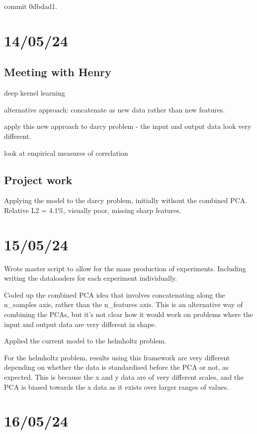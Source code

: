 \documentclass[11pt,a4paper]{article}
\begin{document}
commit 0dbdad1.

\section{14/05/24}

\subsection{Meeting with Henry}

deep kernel learning

alternative approach: concatenate as new data rather than new features.

apply this new approach to darcy problem - the input and output data look very different.

look at empirical measures of correlation

\subsection{Project work}

Applying the model to the darcy problem, initially without the combined PCA.
Relative L2 = 4.1\%, visually poor, missing sharp features.

\section{15/05/24}

Wrote master script to allow for the mass production of experiments.
Including writing the dataloaders for each experiment individually.

Coded up the combined PCA idea that involves concatenating along the n_samples axis, rather than the n_features axis.
This is an alternative way of combining the PCAs, but it's not clear how it would work on problems where the input and output data are very different in shape.

Applied the current model to the helmholtz problem.

For the helmholtz problem, results using this framework are very different depending on whether the data is standardised before the PCA or not, as expected.
This is because the x and y data are of very different scales, and the PCA is biased towards the x data as it exists over larger ranges of values.

\section{16/05/24}
\end{document}

